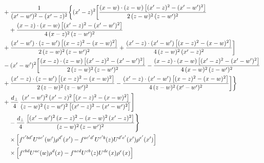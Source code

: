 \documentclass[9pt]{article}
\numberwithin{equation}{section}
\begin{document}
\begin{align}
&+\frac{1}{(x^{\prime}-w^{\prime})^{2}-(x^{\prime}-z)^{2}}\bigg\{(x^{\prime}-z)^{2}\bigg[\frac{(x-w)\cdot(z-w)\,\big[(x^{\prime}-z)^{2}-(x^{\prime}-w^{\prime})^{2}\big]}{2\,(z-w)^{2}\,(z-w^{\prime})^{2}}\notag\\
&\quad +\frac{(x-z)\cdot(x-w)\,\big[(x^{\prime}-z)^{2}-(x^{\prime}-w^{\prime})^{2}\big]}{4\,(x-z)^{2}\,(z-w^{\prime})^{2}}\notag \\ & +\frac{(x^{\prime}-w^{\prime})\cdot(z-w^{\prime})\,\big[(x-z)^{2}-(x-w)^{2}\big]}{2\,(z-w)^{2}\,(z-w^{\prime})^{2}}+\frac{(x^{\prime}-z)\cdot(x^{\prime}-w^{\prime})\,\big[(x-z)^{2}-(x-w)^{2}\big]}{4\,(z-w)^{2}\,(x^{\prime}-z)^{2}}\bigg]\notag\\
&-(x^{\prime}-w^{\prime})^{2}\bigg[\frac{(x-z)\cdot(z-w)\,\big[(x^{\prime}-z)^{2}-(x^{\prime}-w^{\prime})^{2}\big]}{2\,(z-w)^{2}\,(z-w^{\prime})^{2}}-\frac{(x-z)\cdot(x-w)\,\big[(x^{\prime}-z)^{2}-(x^{\prime}-w^{\prime})^{2}\big]}{4\,(x-w)^{2}\,(z-w^{\prime})^{2}}\notag \\ & +\frac{(x^{\prime}-z)\cdot(z-w^{\prime})\,\big[(x-z)^{2}-(x-w)^{2}\big]}{2\,(z-w)^{2}\,(z-w^{\prime})^{2}}-\frac{(x^{\prime}-z)\cdot(x^{\prime}-w^{\prime})\,\big[(x-z)^{2}-(x-w)^{2}\big]}{4\,(z-w)^{2}\,(x^{\prime}-w^{\prime})^{2}}\bigg]\bigg\}\notag\\
&+\frac{d_{\perp}}{4}\,\frac{(x^{\prime}-w^{\prime})^{2}\,(x^{\prime}-z)^{2}\,\big[(x-z)^{2}-(x-w)^{2}\big]}{(z-w)^{2}\,(z-w^{\prime})^{2}\,\big[(x^{\prime}-z)^{2}-(x^{\prime}-w^{\prime})^{2}\big]}\Bigg]\notag\\&\quad-\frac{d_{\perp}}{4}\,\frac{\big[(x^{\prime}-w^{\prime})^{2}\,(x-z)^{2}-(x-w)^{2}\,(x^{\prime}-z)^{2}\big]}{(z-w)^{2}\,(z-w^{\prime})^{2}}\Bigg\}\notag\\&\quad\times\Big[f^{c^{\prime}bd^{\prime}}U^{ac^{\prime}}(w^{\prime})\rho^{d^{\prime}}(x^{\prime})-f^{ac^{\prime}d^{\prime}}U^{c^{\prime}b}(z)U^{d^{\prime}e^{\prime}}(x^{\prime})\rho^{e^{\prime}}(x^{\prime})\Big]\notag\\&\quad\times\Big[f^{cbd}U^{ac}(w)\rho^{d}(x)-f^{acd}U^{cb}(z)U^{de}(x)\rho^{e}(x)\Big]
\end{align}
\end{document}
